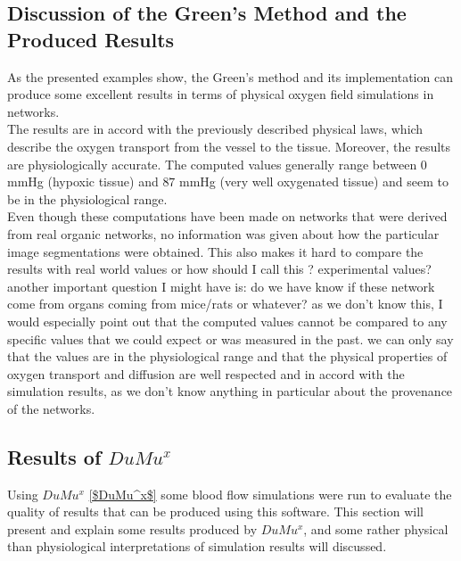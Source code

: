 \subsection{Discussion of the Green's Method and the Produced Results}

As the presented examples show, the Green's method and its implementation can produce some excellent results in terms of physical oxygen field simulations in networks.
\\The results are in accord with the previously described physical laws, which describe the oxygen transport from the vessel to the tissue. Moreover, the results are physiologically accurate. The computed values generally range between $0$ mmHg (hypoxic tissue) and $87$ mmHg (very well oxygenated tissue) and seem to be in the physiological range.
\\Even though these computations have been made on networks that were derived from real organic networks, no information was given about how the particular image segmentations were obtained. This also makes it hard to compare the results with real world values {\color{red} or how should I call this ? experimental values? another important question I might have is: do we have know if these network come from organs coming from mice/rats or whatever? as we don't know this, I would especially point out that the computed values cannot be compared to any specific values that we could expect or was measured in the past. we can only say that the values are in the physiological range and that the physical properties of oxygen transport and diffusion are well respected and in accord with the simulation results}, as we don't know anything in particular about the provenance of the networks.


\subsection{Results of $DuMu^x$} 

Using $DuMu^x$ \ref{$DuMu^x$} some blood flow simulations were run to evaluate the quality of results that can be produced using this software. This section will present and explain some results produced by $DuMu^x$, and some rather physical than physiological interpretations of simulation results will discussed.

